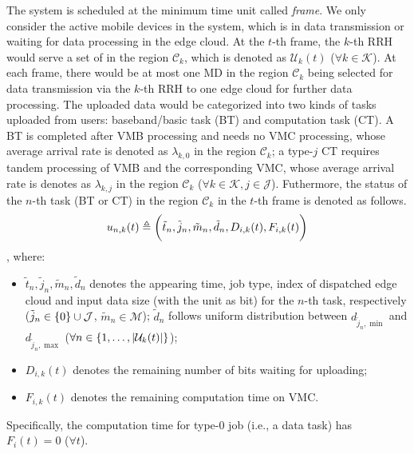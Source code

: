 The system is scheduled at the minimum time unit called \emph{frame}.
We only consider the active mobile devices in the system, which is in data transmission or waiting for data processing in the edge cloud.
At the $t$-th frame, the $k$-th RRH would serve a set of  in the region $\mathcal{C}_{k}$, which is denoted as $\mathcal{U}_{k}(t)$ ($\forall k\in\mathcal{K}$).
At each frame, there would be at most one MD in the region $\mathcal{C}_{k}$ being selected for data transmission via the $k$-th RRH to one edge cloud for further data processing.
The uploaded data would be categorized into two kinds of tasks uploaded from users: baseband/basic task (BT) and computation task (CT).
A BT is completed after VMB processing and needs no VMC processing, whose average arrival rate is denoted as $\lambda_{k,0}$ in the region $\mathcal{C}_{k}$;
a type-$j$ CT requires tandem processing of VMB and the corresponding VMC, whose average arrival rate is denotes as $\lambda_{k,j}$ in the region $\mathcal{C}_{k}$ ($\forall k\in\mathcal{K}, j\in\mathcal{J}$).
Futhermore, the status of the $n$-th task (BT or CT) in the region $\mathcal{C}_{k}$ in the $t$-th frame is denoted as follows.
\begin{align}
    u_{n,k}(t) \triangleq \bigg(
        \tilde{t}_{n}, \tilde{j}_{n}, \tilde{m}_{n}, \tilde{d}_{n}, D_{i,k}(t), F_{i,k}(t)
    \bigg)
\end{align},
where:
\begin{itemize}
    \item $\tilde{t}_{n}, \tilde{j}_{n}, \tilde{m}_{n}, \tilde{d}_{n}$ denotes the appearing time, job type, index of dispatched edge cloud and input data size (with the unit as bit) for the $n$-th task, respectively ($\tilde{j}_{n}\in\{0\}\cup\mathcal{J}$, $\tilde{m}_{n}\in\mathcal{M}$); $\tilde{d}_{n}$ follows uniform distribution between $d_{\tilde{j}_n,\min}$ and $d_{\tilde{j}_n,\max}$ ($\forall n \in \{1, \dots, |\mathcal{U}_{k}(t)|\}$);
    \item $D_{i,k}(t)$ denotes the remaining number of bits waiting for uploading;
    \item $F_{i,k}(t)$ denotes the remaining computation time on VMC.
\end{itemize}
Specifically, the computation time for type-$0$ job (i.e., a data task) has $F_{i}(t)=0$ ($\forall t$).
